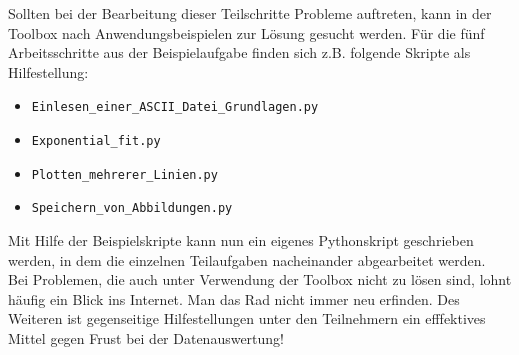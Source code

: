 \documentclass[a4paper]{article}
\numberwithin{equation}{section}
\numberwithin{figure}{section}
\begin{document}
Sollten bei der Bearbeitung dieser Teilschritte Probleme auftreten, kann in der Toolbox nach Anwendungsbeispielen zur Lösung gesucht werden. Für die fünf Arbeitsschritte aus der Beispielaufgabe finden sich z.B. folgende Skripte als Hilfestellung:
\begin{itemize}
\item \verb+Einlesen_einer_ASCII_Datei_Grundlagen.py+
\item \verb+Exponential_fit.py+
\item \verb+Plotten_mehrerer_Linien.py+
\item \verb+Speichern_von_Abbildungen.py+
\end{itemize}
Mit Hilfe der Beispielskripte kann nun ein eigenes Pythonskript geschrieben werden, in dem die einzelnen Teilaufgaben nacheinander abgearbeitet werden.\\[2mm]
Bei Problemen, die auch unter Verwendung der Toolbox nicht zu lösen sind, lohnt häufig ein Blick ins Internet. Man das Rad nicht immer neu erfinden. Des Weiteren ist gegenseitige Hilfestellungen unter den Teilnehmern ein efffektives Mittel gegen Frust bei der Datenauswertung!
\end{document}
